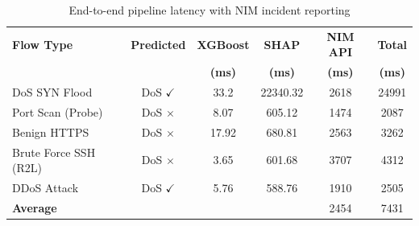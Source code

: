 \begin{table}[h]
\centering
\caption{End-to-end pipeline latency with NIM incident reporting}
\label{tab:latency}
\begin{tabular}{lccccc}
\hline
\textbf{Flow Type} & \textbf{Predicted} & \textbf{XGBoost} & \textbf{SHAP} & \textbf{NIM API} & \textbf{Total} \\
 & & \textbf{(ms)} & \textbf{(ms)} & \textbf{(ms)} & \textbf{(ms)} \\
\hline
DoS SYN Flood & DoS $\checkmark$ & 33.2 & 22340.32 & 2618 & 24991 \\
Port Scan (Probe) & DoS $\times$ & 8.07 & 605.12 & 1474 & 2087 \\
Benign HTTPS & DoS $\times$ & 17.92 & 680.81 & 2563 & 3262 \\
Brute Force SSH (R2L) & DoS $\times$ & 3.65 & 601.68 & 3707 & 4312 \\
DDoS Attack & DoS $\checkmark$ & 5.76 & 588.76 & 1910 & 2505 \\
\hline
\textbf{Average} & & & & 2454 & 7431 \\
\hline
\end{tabular}
\end{table}
